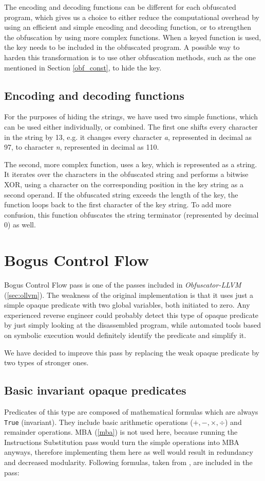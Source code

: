 \documentclass[
  digital, %
  notable,   %
  twoside, %
  nolof,     %
  nolot,     %
]{fithesis3}
\theoremstyle{definition}
\begin{document}
The encoding and decoding functions can be different for each obfuscated program, which gives us a choice to either reduce the computational overhead by using an efficient and simple encoding and decoding function, or to strengthen the obfuscation by using more complex functions. When a keyed function is used, the key needs to be included in the obfuscated program. A possible way to harden this transformation is to use other obfuscation methods, such as the one mentioned in Section \ref{obf_const}, to hide the key.

\subsection{Encoding and decoding functions}
For the purposes of hiding the strings, we have used two simple functions, which can be used either individually, or combined. The first one shifts every character in the string by 13, e.g. it changes every character \textit{a}, represented in decimal as 97, to character \textit{n}, represented in decimal as 110.

The second, more complex function, uses a key, which is represented as a string. It iterates over the characters in the obfuscated string and performs a bitwise XOR, using a character on the corresponding position in the key string as a second operand. If the obfuscated string exceeds the length of the key, the function loops back to the first character of the key string. To add more confusion, this function obfuscates the string terminator (represented by decimal 0) as well.

\section{Bogus Control Flow} \label{des_bogus}

Bogus Control Flow pass is one of the passes included in \textit{Obfuscator-LLVM} (\ref{sec:ollvm}). The weakness of the original implementation is that it uses just a simple opaque predicate with two global variables, both initiated to zero. Any experienced reverse engineer could probably detect this type of opaque predicate by just simply looking at the disassembled program, while automated tools based on symbolic execution would definitely identify the predicate and simplify it. 

We have decided to improve this pass by replacing the weak opaque predicate by two types of stronger ones.

\subsection{Basic invariant opaque predicates}
Predicates of this type are composed of mathematical formulas which are always \texttt{True} (invariant). They include basic arithmetic operations ($+, -, \times, \div$) and remainder operations. MBA (\ref{mba}) is not used here, because running the Instructions Substitution pass would turn the simple operations into MBA anyways, therefore implementing them here as well would result in redundancy and decreased modularity. Following formulas, taken from \cite{loop}, are included in the pass:
\end{document}

